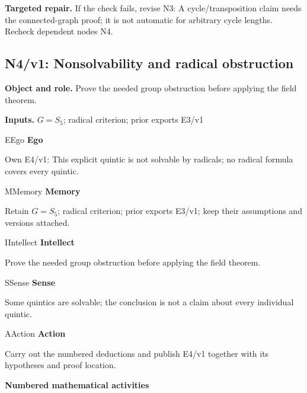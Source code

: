 \documentclass[preprint,12pt,aps,pra,showkeys,amsmath,amssymb,superscriptaddress,floatfix]{revtex4-2}
\theoremstyle{definition}
\theoremstyle{remark}
\newcommand{\mmfaculty}[3]{%
 \begin{mmfacultybox}{#1}{#2}
 {\sffamily\bfseries\color{MMBlue}#2}\par\smallskip #3
 \end{mmfacultybox}}
\newcommand{\field}[2]{\par\smallskip\noindent\textbf{#1.} #2\par}
\begin{document}
\field{Targeted repair}{If the check fails, revise N3: A cycle/transposition claim needs the
connected-graph proof; it is not automatic for arbitrary cycle lengths.
Recheck dependent nodes N4.}

\clearpage

\subsection{N4/v1: Nonsolvability and radical obstruction}

\field{Object and role}{Prove the needed group obstruction before applying the field theorem.}

\field{Inputs}{\(G=S_{5}\); radical criterion; prior exports E3/v1}

\mmfaculty{E}{Ego}{Own E4/v1: This explicit quintic is not solvable by radicals; no radical
formula covers every quintic.}

\mmfaculty{M}{Memory}{Retain \(G=S_{5}\); radical criterion; prior exports E3/v1; keep their
assumptions and versions attached.}

\mmfaculty{I}{Intellect}{Prove the needed group obstruction before applying the field theorem.}

\mmfaculty{S}{Sense}{Some quintics are solvable; the conclusion is not a claim about every
individual quintic.}

\mmfaculty{A}{Action}{Carry out the numbered deductions and publish E4/v1 together with its
hypotheses and proof location.}

\smallskip\noindent\textbf{Numbered mathematical activities}
\end{document}
